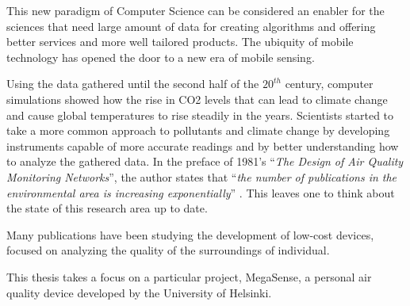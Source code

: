 	This new paradigm of Computer Science can be considered an enabler for the sciences that need large amount of data for creating algorithms and offering better services and more well tailored products.
	The ubiquity of mobile technology has opened the door to a new era of mobile sensing. 
	
	
	Using the data gathered until the second half of the $20^{th}$ century, computer simulations showed how the rise in CO2 levels that can lead to climate change and cause global temperatures to rise steadily in the years.
	Scientists started to take a more common approach to pollutants and climate change by developing instruments capable of more accurate readings and by better understanding how to analyze the gathered data.
	In the preface of 1981's ``\textit{The Design of Air Quality Monitoring Networks}'', the author states that ``\textit{the number of publications in the environmental area is increasing exponentially}'' \cite{airqualitynetworks}.
	This leaves one to think about the state of this research area up to date.
	

	Many publications have been studying the development of low-cost devices, focused on analyzing the quality of the surroundings of individual. 
	
	This thesis takes a focus on a particular project, MegaSense, a personal air quality device developed by the University of Helsinki.
	
